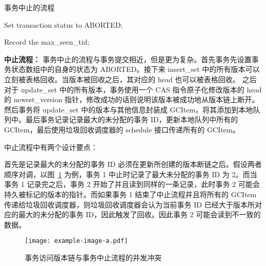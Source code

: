 \begin{algorithm}[h]
    \caption{事务中止的流程}
    \label{alg:abort}
    \BlankLine
    Set transaction status to ABORTED;



    Record the max\_seen\_tid;



\end{algorithm}

\textbf{中止流程：} 事务中止的流程与事务提交相近，但是更为复杂。首先事务先设置事务状态数组中的自身的状态为 ABORTED。接下来 insert\_set 中的所有版本可以立刻被表格回收。当版本被回收之后，其对应的 head 也可以被表格回收。
之后对于 update\_set 中的所有版本，事务使用一个 CAS 指令原子化修改版本的 head 的 newest\_version 指针，修改成功的话则说明该版本被成功地从版本链上断开。然后事务将 update\_set 中的版本与其他信息封装成 GCItem，将其添加到本地队列中。最后事务记录记录最大的未分配的事务 ID，更新本地队列中所有的 GCItem，最后使用垃圾回收调度器的 schedule 接口传递所有的 GCItem。

中止流程中有两个设计要点：

首先是记录最大的未分配的事务 ID 必须在更新所创建的版本断链之后。假设两者顺序对调，以图~\ref{fig:update-abort-read} 为例，事务 1 中止时记录了最大未分配的事务 ID 为 2。而当事务 1 记录完之后，事务 2 开始了并且读到同样的一条记录，此时事务 2 可能会持久被标记的版本的指针。而如果事务 1 结束了中止流程并且将所有的 GCItem 传递给垃圾回收调度器，则垃圾回收调度器会认为当前事务 ID 已经大于版本所对应的最大的未分配的事务 ID，因此触发了回收。因此事务 2 可能会读到不一致的数据。

\begin{figure}
    \centering
    \texttt{[image: example-image-a.pdf]}
    \caption{事务访问版本链与事务中止流程的并发冲突}
    \label{fig:update-abort-read}
\end{figure}


